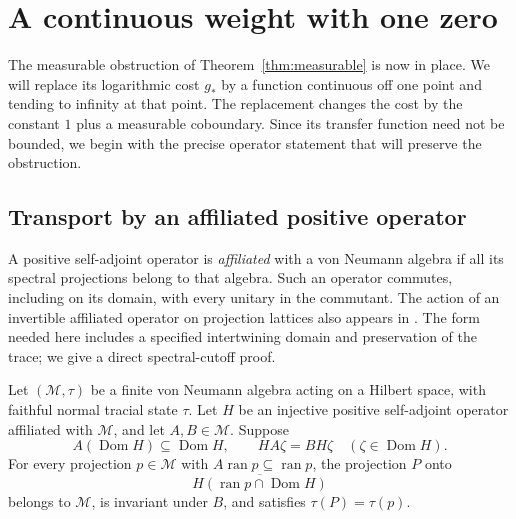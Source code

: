 \section{A continuous weight with one zero}
\label{sec:continuity}

The measurable obstruction of Theorem~\ref{thm:measurable} is now in place.
We will replace its logarithmic cost $g_*$ by a function continuous off one
point and tending to infinity at that point.  The replacement changes the
cost by the constant $1$ plus a measurable coboundary.  Since its transfer function need not be
bounded, we begin with the precise operator statement that will preserve
the obstruction.

\subsection{Transport by an affiliated positive operator}

A positive self-adjoint operator is \emph{affiliated} with a von Neumann
algebra if all its spectral projections belong to that algebra.  Such an
operator commutes, including on its domain, with every unitary in the
commutant.
The action of an invertible affiliated operator on projection lattices
also appears in \citet[Proposition~3.1]{mori}.  The form needed here
includes a specified intertwining domain and preservation of the trace;
we give a direct spectral-cutoff proof.

\begin{lemma}\label{lem:affiliated-transport}
Let $(\mathcal M,\tau)$ be a finite von Neumann algebra acting on a Hilbert
space, with faithful normal tracial state $\tau$.  Let $H$ be an injective
positive self-adjoint operator affiliated with $\mathcal M$, and let
$A,B\in\mathcal M$.  Suppose
\[
 A(\operatorname{Dom}H)\subseteq\operatorname{Dom}H,
 \qquad HA\zeta=BH\zeta\quad(\zeta\in\operatorname{Dom}H).
\]
For every projection $p\in\mathcal M$ with $A\operatorname{ran}p\subseteq
\operatorname{ran}p$, the projection $P$ onto
\[
 \overline{H(\operatorname{ran}p\cap\operatorname{Dom}H)}
\]
belongs to $\mathcal M$, is invariant under $B$, and satisfies
$\tau(P)=\tau(p)$.
\end{lemma}

